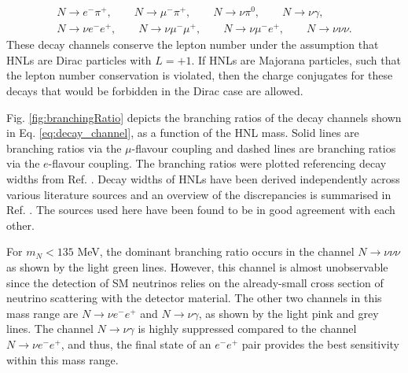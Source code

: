 \begin{equation}
\begin{split}
\label{eq:decay_channel}
	N\rightarrow e^{-}\pi^{+},\qquad 
	N\rightarrow \mu^{-}\pi^{+},\qquad
	N\rightarrow \nu \pi^{0},\qquad 
	N\rightarrow \nu \gamma,\qquad \\ 
	N\rightarrow \nu e^{-} e^{+},\qquad 
	N\rightarrow \nu \mu^{-} \mu^{+},\qquad 
	N\rightarrow \nu \mu^{-}e^{+},\qquad
	N\rightarrow \nu \nu \nu.   
\end{split}
\end{equation}
These decay channels conserve the lepton number under the assumption that HNLs are Dirac particles with $L=+1$.
If HNLs are Majorana particles, such that the lepton number conservation is violated, then the charge conjugates for these decays that would be forbidden in the Dirac case are allowed.


Fig. \ref{fig:branchingRatio} depicts the branching ratios of the decay channels shown in Eq. \ref{eq:decay_channel}, as a function of the HNL mass.
Solid lines are branching ratios via the $\mu$-flavour coupling and dashed lines are branching ratios via the $e$-flavour coupling.
The branching ratios were plotted referencing decay widths from Ref. \cite {HNLBin, SBNHNL, HNLZarko}.
Decay widths of HNLs have been derived independently across various literature sources and an overview of the discrepancies is summarised in Ref. \cite{HNLZarko}. 
The sources used here have been found to be in good agreement with each other.

For $m_{N} < 135$ MeV, the dominant branching ratio occurs in the channel $N\rightarrow \nu\nu\nu$ as shown by the light green lines.
However, this channel is almost unobservable since the detection of SM neutrinos relies on the already-small cross section of neutrino scattering with the detector material.
The other two channels in this mass range are $N\rightarrow \nu e^{-}e^{+}$ and $N\rightarrow \nu \gamma$, as shown by the light pink and grey lines.
The channel $N\rightarrow \nu \gamma$ is highly suppressed compared to the channel $N\rightarrow \nu e^{-}e^{+}$, and thus, the final state of an $e^-e^+$ pair provides the best sensitivity within this mass range.

